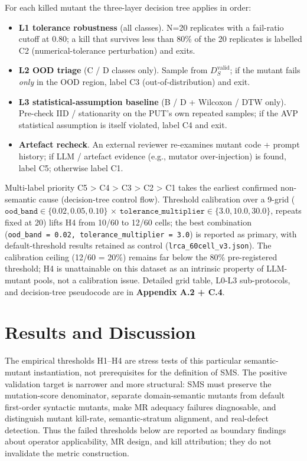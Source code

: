 \documentclass[12pt]{article}
\providecommand{\tightlist}{\setlength{\itemsep}{0pt}\setlength{\parskip}{0pt}}
\begin{document}
For each killed mutant the three-layer decision tree applies in order:

\begin{itemize}
\tightlist
\item
  \textbf{L1 tolerance robustness} (all classes). N=20 replicates with a
  fail-ratio cutoff at 0.80; a kill that survives less than 80\% of the
  20 replicates is labelled C2 (numerical-tolerance perturbation) and
  exits.
\item
  \textbf{L2 OOD triage} (C / D classes only). Sample from
  $D_S^{\mathrm{valid}}$; if the mutant fails \emph{only} in the OOD
  region, label C3 (out-of-distribution) and exit.
\item
  \textbf{L3 statistical-assumption baseline} (B / D + Wilcoxon / DTW
  only). Pre-check IID / stationarity on the PUT's own repeated samples;
  if the AVP statistical assumption is itself violated, label C4 and
  exit.
\item
  \textbf{Artefact recheck}. An external reviewer re-examines mutant
  code + prompt history; if LLM / artefact evidence (e.g., mutator
  over-injection) is found, label C5; otherwise label C1.
\end{itemize}

Multi-label priority C5 \textgreater{} C4 \textgreater{} C3
\textgreater{} C2 \textgreater{} C1 takes the earliest confirmed
non-semantic cause (decision-tree control flow). Threshold calibration
over a 9-grid ($\texttt{ood\_band} \in \{0.02, 0.05, 0.10\}$ $\times$
$\texttt{tolerance\_multiplier} \in \{3.0, 10.0, 30.0\}$, repeats fixed
at 20) lifts H4 from 10/60 to 12/60 cells; the best combination
(\texttt{ood\_band\ =\ 0.02,\ tolerance\_multiplier\ =\ 3.0}) is
reported as primary, with default-threshold results retained as control
(\texttt{lrca\_60cell\_v3.json}). The calibration ceiling (12/60 = 20\%)
remains far below the 80\% pre-registered threshold; H4 is unattainable
on this dataset as an intrinsic property of LLM-mutant pools, not a
calibration issue. Detailed grid table, L0-L3 sub-protocols, and
decision-tree pseudocode are in \textbf{Appendix A.2 + C.4}.


\section{Results and Discussion}\label{statistical-analysis-and-empirical-results}

The empirical thresholds H1--H4 are stress tests of this particular
semantic-mutant instantiation, not prerequisites for the definition of
SMS. The positive validation target is narrower and more structural:
SMS must preserve the mutation-score denominator, separate
domain-semantic mutants from default first-order syntactic mutants, make
MR adequacy failures diagnosable, and distinguish mutant kill-rate,
semantic-stratum alignment, and real-defect detection. Thus the failed
thresholds below are reported as boundary findings about operator
applicability, MR design, and kill attribution; they do not invalidate
the metric construction.
\end{document}
